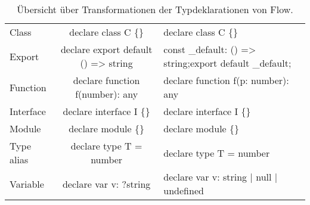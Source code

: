 \begin{table}[tbh]
  \footnotesize
  \begin{tabu} to 
    \midrule
     &  &  \\
    \midrule
    Class       & declare class C \{\}                 & declare class C \{\}                     \\
    Export      & declare export default () => string  & const \_default: () => string;\newline export default \_default; \\
    Function    & declare function f(number): any      & declare function f(p: number): any       \\
    Interface   & declare interface I \{\}             & declare interface I \{\}                 \\
    Module      & declare module  \{\}   & declare module  \{\}       \\
    Type alias  & declare type T = number              & declare type T = number                  \\
    Variable    & declare var v: ?string               & declare var v: string | null | undefined \\
    \midrule
  \end{tabu}
  \caption{Übersicht über Transformationen der Typdeklarationen von Flow.}
  \label{tab:transformation-declarations}
\end{table}
